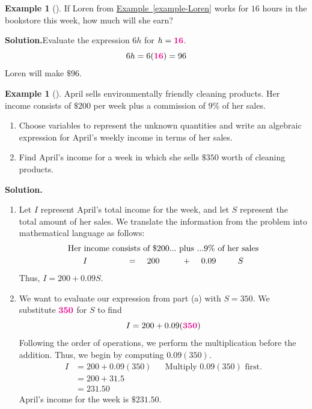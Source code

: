 \documentclass[10pt,]{book}
\theoremstyle{plain}
\theoremstyle{definition}
\theoremstyle{definition}
\newtheorem{example}[theorem]{Example}
\theoremstyle{definition}
\numberwithin{equation}{part}
\newcommand{\alert}[1]{\boldsymbol{\color{magenta}{#1}}}
\newcommand{\amp}{&}
\begin{document}
\begin{example}[]\label{example-19}
If Loren from \hyperref[example-Loren]{Example~\ref{example-Loren}} works for \(16\) hours in the bookstore this week, how much will she earn?%
\par\medskip\noindent%
\textbf{Solution.}\quad Evaluate the expression \(6h\) for \(h=\alert{16}\).%
\begin{equation*}
6h = 6(\alert{16}) = 96
\end{equation*}
Loren will make \(\$96\).%
\end{example}
\begin{example}[]\label{example-April}
April sells environmentally friendly cleaning products. Her income consists of \(\$200\) per week plus a commission of \(9\%\) of her sales. \leavevmode%
\begin{enumerate}[label=*\alph**]
\item\hypertarget{li-131}{}Choose variables to represent the unknown quantities and write an algebraic expression for April's weekly income in terms of her sales.%
\item\hypertarget{li-132}{}Find April's income for a week in which she sells \(\$350\) worth of cleaning products.%
\end{enumerate}
%
\par\medskip\noindent%
\textbf{Solution.}\quad \leavevmode%
\begin{enumerate}[label=*\alph**]
\item\hypertarget{li-133}{}Let \(I\) represent April's total income for the week, and let \(S\) represent the total amount of her sales. We translate the information from the problem into mathematical language as follows:%
\begin{gather*}
\text{Her income consists of }\$200 . . .\text{ plus }. . . 9\% \text{ of her sales} 
\\
I \hphantom{consists of}= \hphantom{of}200 \hphantom{plus+}+ \hphantom{....}0.09 \hphantom{of her}S
\end{gather*}
Thus, \(I = 200 + 0.09S\).%
\item\hypertarget{li-134}{}We want to evaluate our expression from part (a) with \(S = 350\). We substitute \(\alert{350}\) for \(S\) to find%
\begin{equation*}
I = 200 + 0.09(\alert{350})
\end{equation*}
Following the order of operations, we perform the multiplication before the addition. Thus, we begin by computing \(0.09(350)\).%
\begin{align*}
I \amp = 200 + 0.09(350)\amp\amp\text{Multiply }0.09 (350) \text{ first.}
\\
\amp = 200 + 31.5\\
\amp = 231.50
\end{align*}
April's income for the week is \(\$231.50\).%
\end{enumerate}
%
\end{example}
\end{document}

